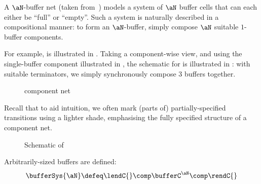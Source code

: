 A $\aN$-buffer net (taken from~\cite{Esparza1996}) models a system of $\aN$
buffer cells that can each either be ``full'' or ``empty''. Such a system is
naturally described in a compositional manner: to form an $\aN$-buffer, simply
compose $\aN$ suitable $1$-buffer components.

\begin{figure}[ht]
\centering
{}
\caption{}
\label{fig:buffer3}
\end{figure}

For example,  is illustrated in . Taking a
component-wise view, and using the single-buffer component illustrated in
, the schematic for  is illustrated in
: with suitable terminators, we simply synchronously
compose 3 buffers together.

\begin{figure}[ht]
\centering
\setlength{\fboxsep}{0pt}
\begin{subfigure}{0.33\textwidth}
\centering
{}
\caption{\bufferC{} }
\end{subfigure}%
\caption{\bufferSys{\aN} component net}
\label{fig:buffer1}
\end{figure}

Recall that to aid intuition, we often mark (parts of) partially-specified
transitions using a lighter shade, emphasising the fully specified structure of
a component net.

\begin{figure}[ht]%
\centering
{}
\caption{Schematic of }
\label{fig:bufferschematic}
\end{figure}

Arbitrarily-sized buffers are defined:
\[
    \bufferSys{\aN} \defeq \lendC{} \comp \bufferC^\aN \comp \rendC{}
\]
